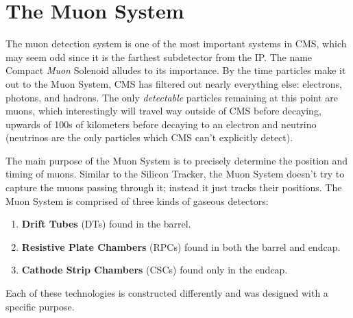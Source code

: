 \section{The Muon System}
\label{sec:muon_sys}

The muon detection system is one of the most important systems in CMS, which may seem odd since it is the farthest subdetector from the IP.
The name Compact {\it Muon} Solenoid alludes to its importance.
By the time particles make it out to the Muon System, CMS has filtered out nearly everything else: electrons, photons, and hadrons.
The only \emph{detectable} particles remaining at this point are muons, which interestingly will travel way outside of CMS before decaying, upwards of 100s of kilometers before decaying to an electron and neutrino (neutrinos are the only particles which CMS can't explicitly detect).

The main purpose of the Muon System is to precisely determine the position and timing of muons.
Similar to the Silicon Tracker, the Muon System doesn't try to capture the muons passing through it;
instead it just tracks their positions. 
The Muon System is comprised of three kinds of gaseous detectors: 
\begin{enumerate}
    \item {\bf Drift Tubes} (DTs) found in the barrel.
    \item {\bf Resistive Plate Chambers} (RPCs) found in both the barrel and endcap.
    \item {\bf Cathode Strip Chambers} (CSCs) found only in the endcap.
\end{enumerate}
Each of these technologies is constructed differently and was designed with a specific purpose. 

